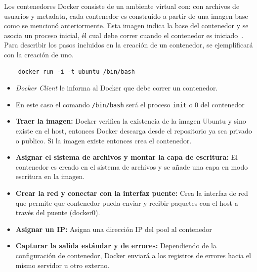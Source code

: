 Los contenedores Docker consiste de un ambiente virtual con: con archivos de usuarios y metadata, cada contenedor es construido a partir de una imagen base como se mencionó anteriormente. 
Esta imagen indica la base del contenedor y se asocia un proceso inicial, él cual debe correr cuando el contenedor es iniciado~\cite{Docker:2015:understanding}. Para describir los pasos incluidos en la creación de un contenedor, se ejemplificará con la creación de uno.

\begin{verbatim}
	docker run -i -t ubuntu /bin/bash
\end{verbatim}
	\begin{itemize}
		\item \emph{Docker Client} le informa al Docker que debe correr un contenedor.
		\item En este caso el comando \texttt{/bin/bash} será el proceso \texttt{init} o 0 del contenedor
		\item \textbf{Traer la imagen:} Docker verifica la existencia de la imagen Ubuntu y sino existe en el host, entonces Docker descarga desde el repositorio ya sea privado o publico. Si la imagen existe entonces crea el contenedor.
		\item \textbf{Asignar el sistema de archivos y montar la capa de escritura:} El contenedor es creado en el sistema de archivos y se añade una capa en modo escritura en la imagen.
		\item \textbf{Crear la red y conectar con la interfaz puente:} Crea la interfaz de red que permite que contenedor pueda enviar y recibir paquetes con el host a través del puente (docker0).
		\item \textbf{Asignar un IP:} Asigna una dirección IP del pool al contenedor
		\item \textbf{Capturar la salida estándar y de errores:} Dependiendo de la configuración de contenedor, Docker enviará a los registros de errores hacia el mismo servidor u otro externo.
	\end{itemize}

